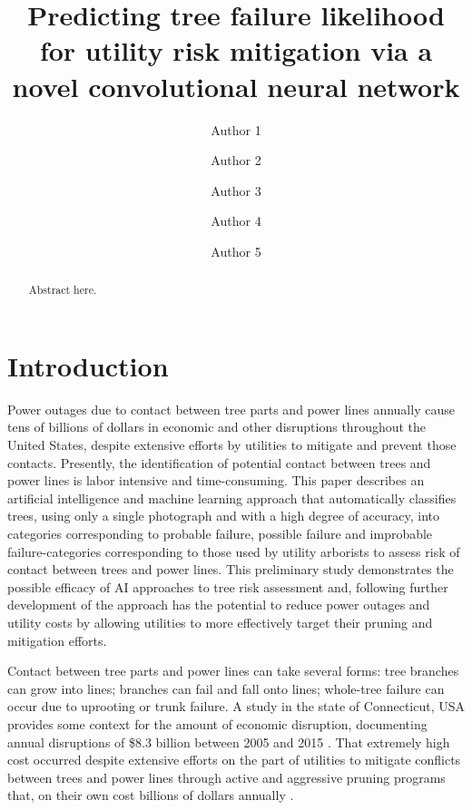 \documentclass[Journal,letterpaper, SingleSpace, InsideFigs]{ascelike-new}
\begin{document}
\title{Predicting tree failure likelihood for utility risk mitigation via a novel convolutional neural network}
\author[1]{Author 1}
\author[2]{Author 2}
\author[2]{Author 3}
\author[2]{Author 4}
\author[2]{Author 5}


\maketitle

\begin{abstract}
    Abstract here.
\end{abstract}

\section{Introduction}
Power outages due to contact between tree parts and power lines annually cause tens of billions of dollars in economic and other disruptions throughout the United States, despite extensive efforts by utilities to mitigate and prevent those contacts.  Presently, the identification of potential contact between trees and power lines is labor intensive and time-consuming.  This paper describes an artificial intelligence and machine learning approach that automatically classifies trees, using only a single photograph and with a high degree of accuracy, into categories corresponding to probable failure, possible failure and improbable failure-categories corresponding to those used by utility arborists to assess risk of contact between trees and power lines.  This preliminary study demonstrates the possible efficacy of AI approaches to tree risk assessment and, following further development of the approach has the potential to reduce power outages and utility costs by allowing utilities to more effectively target their pruning and mitigation efforts.  

Contact between tree parts and power lines can take several forms: tree branches can grow into lines; branches can fail and fall onto lines; whole-tree failure can occur due to uprooting or trunk failure.  A study in the state of Connecticut, USA provides some context for the amount of economic disruption, documenting annual disruptions of \$8.3 billion between 2005 and 2015 \cite{graziano2020wider}.  That extremely high cost occurred despite extensive efforts on the part of utilities to mitigate conflicts between trees and power lines through active and aggressive pruning programs that, on their own cost billions of dollars annually \cite{guggenmoos2003effects}.  
\end{document}
